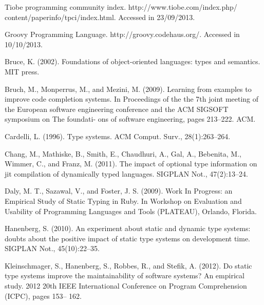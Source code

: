 \documentclass[preprint]{sigplanconf}
\begin{document}
%
%

\renewcommand{\bibfont}{\normalsize}
\begin{thebibliography}{}
\softraggedright

Tiobe programming community index. http://www.tiobe.com/index.php/ content/paperinfo/tpci/index.html. Accessed in 23/09/2013.

Groovy Programming Language. http://groovy.codehaus.org/. Accessed in 10/10/2013.

Bruce, K. (2002). Foundations of object-oriented languages: types and semantics. MIT press.

Bruch, M., Monperrus, M., and Mezini, M. (2009). Learning from examples to improve code completion systems. In Proceedings of the the 7th joint meeting of the European software engineering conference and the ACM SIGSOFT symposium on The foundati- ons of software engineering, pages 213–222. ACM.

Cardelli, L. (1996). Type systems. ACM Comput. Surv., 28(1):263–264.

Chang, M., Mathiske, B., Smith, E., Chaudhuri, A., Gal, A., Bebenita, M., Wimmer, C., and Franz, M. (2011). The impact of optional type information on jit compilation of dynamically typed languages. SIGPLAN Not., 47(2):13–24.

Daly, M. T., Sazawal, V., and Foster, J. S. (2009). Work In Progress: an Empirical Study of Static Typing in Ruby. In Workshop on Evaluation and Usability of Programming Languages and Tools (PLATEAU), Orlando, Florida.

Hanenberg, S. (2010). An experiment about static and dynamic type systems: doubts about the positive impact of static type systems on development time. SIGPLAN Not., 45(10):22–35.

Kleinschmager, S., Hanenberg, S., Robbes, R., and Stefik, A. (2012). Do static type systems improve the maintainability of software systems? An empirical study. 2012 20th IEEE International Conference on Program Comprehension (ICPC), pages 153– 162.


\end{thebibliography}
\end{document}
